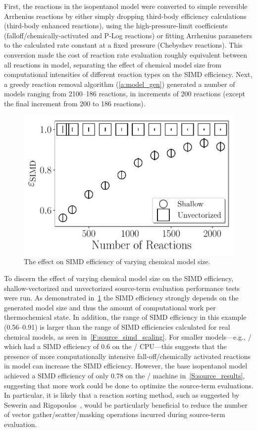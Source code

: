 \documentclass[12pt,number,sort&compress,preprint]{elsarticle}
\begin{document}
First, the reactions in the isopentanol model were converted to simple reversible Arrhenius reactions by either simply dropping third-body efficiency calculations (third-body enhanced reactions), using the high-pressure-limit coefficients (falloff\slash chemically-activated and P-Log reactions) or fitting Arrhenius parameters to the calculated rate constant at a fixed pressure (Chebyshev reactions).
This conversion made the cost of reaction rate evaluation roughly equivalent between all reactions in model, separating the effect of chemical model size from computational intensities of different reaction types on the SIMD efficiency.
Next, a greedy reaction removal algorithm (\cref{a:model_gen}) generated a number of models ranging from \numrange{2100}{186} reactions, in increments of 200 reactions (except the final increment from \num{200} to \num{186} reactions).

\begin{figure}[htbp]
\centering
\includegraphics[width=0.5\linewidth]{simd_efficiency_scaling}
\caption{The effect on SIMD efficiency of varying chemical model size.}
\label{F:simd_vs_rxns}
\end{figure}

To discern the effect of varying chemical model size on the SIMD efficiency, shallow-vectorized and unvectorized source-term evaluation performance tests were run.
As demonstrated in~\cref{F:simd_vs_rxns} the SIMD efficiency strongly depends on the generated model size and thus the amount of computational work per thermochemical state.
In addition, the range of SIMD efficiency in this example (\numrange{0.56}{0.91}) is larger than the range of SIMD efficiencies calculated for real chemical models, as seen in~\cref{F:source_simd_scaling}.
For smaller models---e.g., \slash{} which had a SIMD efficiency of \num{0.6} on the \avx/ CPU---this suggests that the presence of more computationally intensive fall-off\slash chemically activated reactions in model can increase the SIMD efficiency.
However, the base isopentanol model achieved a SIMD efficiency of only \num{0.78} on the \avx/ machine in~\cref{S:source_results}, suggesting that more work could be done to optimize the source-term evaluations.
In particular, it is likely that a reaction sorting method, such as suggested by Sewerin and Rigopoulos~\cite{Sewerin20151375}, would be particularly beneficial to reduce the number of vector gather\slash scatter\slash masking operations incurred during source-term evaluation.

\pagebreak

\end{document}
